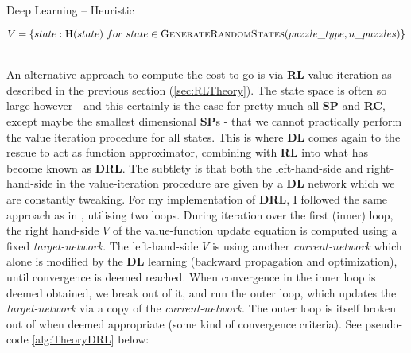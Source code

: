 \newlength\mylen
\settowidth{}
\teal
\begin{algorithm}[H]
\caption{Deep Learning -- Heuristic}\label{alg:TheoryDLDRL}
\begin{algorithmic}
 \black
{}
\State $V = \{state: \Call{H}{state} \ for \ state \in \Call{GenerateRandomStates}{puzzle\_type, n\_puzzles}\}$
\ \ \ \ 
\EndFunction
\end{algorithmic}
\end{algorithm}
\black
\noindent An alternative approach to compute the cost-to-go is via \textbf{RL} value-iteration as described in the previous section (\ref{sec:RLTheory}). The state space is often so large however - and this certainly is the case for pretty much all \textbf{SP} and \textbf{RC}, except maybe the smallest dimensional \textbf{SP}s - that we cannot practically perform the value iteration procedure for all states. This is where \textbf{DL} comes again to the rescue to act as function approximator, combining with \textbf{RL} into what has become known as \textbf{DRL}. The subtlety is that both the left-hand-side and right-hand-side in the value-iteration procedure are given by a \textbf{DL} network which we are constantly tweaking. For my implementation of \textbf{DRL}, I followed the same approach as in \cite{Mnih2013}, utilising two loops. During iteration over the first (inner) loop, the right hand-side $V$ of the value-function update equation is computed using a fixed \textit{target-network}. The left-hand-side $V$ is using another \textit{current-network} which alone is modified by the \textbf{DL} learning (backward propagation and optimization), until convergence is deemed reached. When convergence in the inner loop is deemed obtained, we break out of it, and run the outer loop, which updates the \textit{target-network} via a copy of the \textit{current-network}. The outer loop is itself broken out of when deemed appropriate (some kind of convergence criteria). See pseudo-code \ref{alg:TheoryDRL} below:
\\
\\
\teal
